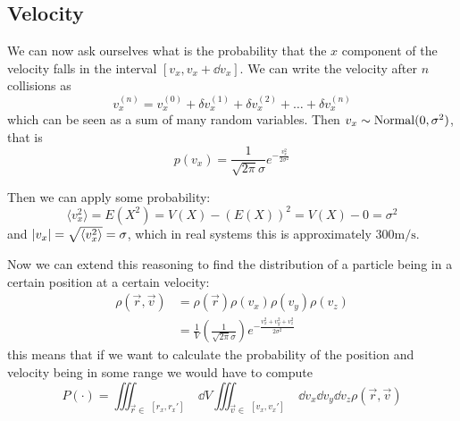 \documentclass[12pt]{extarticle}
\newcommand{\anglebraces}[1]{
    \langle #1 \rangle
}
\begin{document}
\subsection{Velocity}

We can now ask ourselves what is the probability that the $x$ component of the velocity falls in the interval $[v_x, v_x + \dd{v_x}]$.
We can write the velocity after $n$ collisions as
\begin{equation}
    v_x^{(n)} = v_x^{(0)} + \delta v_x^{(1)} + \delta v_x^{(2)} + \dots +\delta v_x^{(n)}
\end{equation}
which can be seen as a sum of many random variables.
Then $v_x \sim {\operatorfont Normal}(0, \sigma^2)$, that is
\begin{equation}
    p(v_x) = \frac{1}{\sqrt{2 \pi} \sigma} e^{-\frac{v_x^2}{2 \sigma^2}}
\end{equation}

Then we can apply some probability:
\begin{equation}
    \anglebraces{v_x^2} = E(X^2) = V(X) - (E(X))^2 = V(X) - 0 = \sigma^2
\end{equation}
and $\abs{v_x} = \sqrt{\anglebraces{v_x^2}} = \sigma$, which in real systems this is approximately $300 \si{\meter \per \second}$.

Now we can extend this reasoning to find the distribution of a particle being in a certain position at a certain velocity:
\begin{align}
    \rho(\vec r, \vec v) & = \rho(\vec r) \rho(v_x) \rho(v_y) \rho(v_z)                                                           \\
                         & = \frac{1}{V} \left(\frac{1}{\sqrt{2 \pi} \sigma}\right) e^{-\frac{v_x^2 + v_y^2 + v_z^2}{2 \sigma^2}}
\end{align}
this means that if we want to calculate the probability of the position and velocity being in some range we would have to compute
\begin{equation}
    P(\cdot) = \iiint_{\vec r \in \substack{[r_x, r_x']                                                             \\ [r_y, r_y'] \\ [r_z, r_z']}} \dd{V} \iiint_{\vec v \in \substack{[v_x, v_x']                                                             \\ [v_y, v_y'] \\ [v_z, v_z']}} \dd{v_x} \dd{v_y} \dd{v_z} \rho(\vec r, \vec v)
\end{equation}
\end{document}
